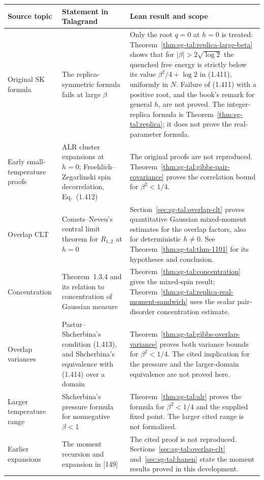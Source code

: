 \begin{center}
\begin{tabular}{|p{}|p{}|p{}|}
\hline
\textbf{Source topic} & \textbf{Statement in Talagrand} & \textbf{Lean result and scope} \\
\hline
Original SK formula & The replica-symmetric formula fails at large $\beta$ & Only the root $q=0$ at $h=0$ is treated: Theorem~\ref{thm:sg-tal:replica-large-beta} shows that for $|\beta|>2\sqrt{\log2}$ the quenched free energy is strictly below its value $\beta^2/4+\log2$ in (1.411), uniformly in $N$. Failure of (1.411) with a positive root, and the book's remark for general $h$, are not proved. The integer-replica formula is Theorem~\ref{thm:sg-tal:replica}; it does not prove the real-parameter formula. \\
\hline
Early small-temperature proofs & ALR cluster expansions at $h=0$; Froehlich--Zegarlinski spin decorrelation, Eq.~(1.412) & The original proofs are not reproduced. Theorem~\ref{thm:sg-tal:gibbs-pair-covariance} proves the correlation bound for $\beta^2<1/4$. \\
\hline
Overlap CLT & Comets--Neveu's central limit theorem for $R_{1,2}$ at $h=0$ & Section~\ref{sec:sg-tal:overlap-clt} proves quantitative Gaussian mixed-moment estimates for the overlap factors, also for deterministic $h\ne0$. See Theorem~\ref{thm:sg-tal:thm-1101} for its hypotheses and conclusion. \\
\hline
Concentration & Theorem~1.3.4 and its relation to concentration of Gaussian measure & Theorem~\ref{thm:sg-tal:concentration} gives the mixed-spin result; Theorem~\ref{thm:sg-tal:replica-real-moment-sandwich} uses the scalar pair-disorder concentration estimate. \\
\hline
Overlap variances & Pastur--Shcherbina's condition (1.413), and Shcherbina's equivalence with (1.414) over a domain & Theorem~\ref{thm:sg-tal:gibbs-overlap-variance} proves both variance bounds for $\beta^2<1/4$. The cited implication for the pressure and the larger-domain equivalence are not proved here. \\
\hline
Larger temperature range & Shcherbina's pressure formula for nonnegative $\beta<1$ & Theorem~\ref{thm:sg-tal:alr} proves the formula for $\beta^2<1/4$ and the supplied fixed point. The larger cited range is not formalized. \\
\hline
Earlier expansions & The moment recursion and expansion in [149] & The cited proof is not reproduced. Sections~\ref{sec:sg-tal:overlap-clt} and~\ref{sec:sg-tal:hanen} state the moment results proved in this development. \\

\end{tabular}
\end{center}
